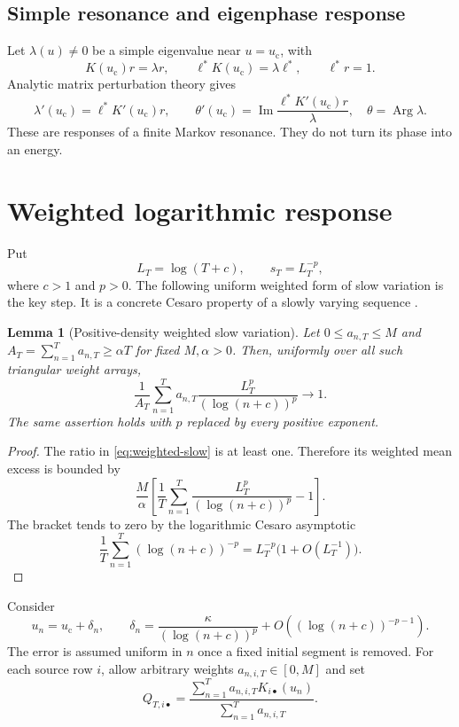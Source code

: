 \documentclass[11pt]{article}
\newtheorem{lemma}[theorem]{Lemma}
\theoremstyle{definition}
\theoremstyle{remark}
\newcommand{\uc}{u_{\mathrm c}}
\newcommand{\Arg}{\operatorname{Arg}}
\begin{document}
\subsection{Simple resonance and eigenphase response}

Let $\lambda(u)\ne0$ be a simple eigenvalue near $u=\uc$, with
\[
  K(\uc)r=\lambda r,\qquad
  \ell^*K(\uc)=\lambda\ell^*,\qquad
  \ell^*r=1.
\]
Analytic matrix perturbation theory gives
\begin{equation}\label{eq:eigen-derivative}
  \lambda'(\uc)=\ell^*K'(\uc)r,
  \qquad
  \theta'(\uc)=
  \operatorname{Im}\frac{\ell^*K'(\uc)r}{\lambda},
  \quad \theta=\Arg\lambda.
\end{equation}
These are responses of a finite Markov resonance.  They do not turn its phase
into an energy.

\section{Weighted logarithmic response}
\label{sec:weighted}

Put
\[
  L_T=\log(T+c),\qquad s_T=L_T^{-p},
\]
where $c>1$ and $p>0$.  The following uniform weighted form of slow
variation is the key step.  It is a concrete Cesaro property of a slowly
varying sequence \citep{BinghamGoldieTeugels1987}.

\begin{lemma}[Positive-density weighted slow variation]
\label{lem:weighted-slow}
Let $0\le a_{n,T}\le M$ and
$A_T=\sum_{n=1}^T a_{n,T}\ge\alpha T$ for fixed $M,\alpha>0$.
Then, uniformly over all such triangular weight arrays,
\begin{equation}\label{eq:weighted-slow}
  \frac1{A_T}\sum_{n=1}^Ta_{n,T}
  \frac{L_T^p}{(\log(n+c))^p}
  \longrightarrow1.
\end{equation}
The same assertion holds with $p$ replaced by every positive exponent.
\end{lemma}

\begin{proof}
The ratio in \eqref{eq:weighted-slow} is at least one.  Therefore its
weighted mean excess is bounded by
\[
  \frac{M}{\alpha}
  \left[
    \frac1T\sum_{n=1}^T
    \frac{L_T^p}{(\log(n+c))^p}-1
  \right].
\]
The bracket tends to zero by the logarithmic Cesaro asymptotic
\[
  \frac1T\sum_{n=1}^T(\log(n+c))^{-p}
  =L_T^{-p}\bigl(1+O(L_T^{-1})\bigr).
\]
\end{proof}

Consider
\begin{equation}\label{eq:unanchored-schedule}
  u_n=\uc+\delta_n,\qquad
  \delta_n=
  \frac{\kappa}{(\log(n+c))^p}
  +O\left((\log(n+c))^{-p-1}\right).
\end{equation}
The error is assumed uniform in $n$ once a fixed initial segment is removed.
For each source row $i$, allow arbitrary weights $a_{n,i,T}\in[0,M]$ and set
\begin{equation}\label{eq:general-weighted-row}
  Q_{T,i\bullet}
  =
  \frac{\sum_{n=1}^T a_{n,i,T}K_{i\bullet}(u_n)}
       {\sum_{n=1}^T a_{n,i,T}}.
\end{equation}
\end{document}
